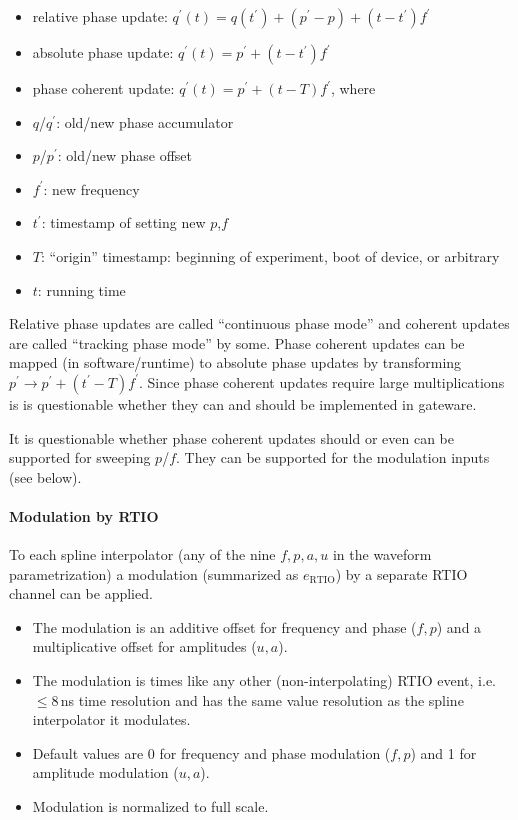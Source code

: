 \documentclass[11pt]{paper}
\begin{document}
\begin{itemize}
	\item relative phase update: $q^\prime(t) = q(t^\prime) + (p^\prime - p) + (t - t^\prime) f^\prime$
	\item absolute phase update: $q^\prime(t) = p^\prime + (t - t^\prime) f^\prime$
	\item phase coherent update: $q^\prime(t) = p^\prime + (t - T) f^\prime$, where
	\item $q$/$q^\prime$: old/new phase accumulator
	\item $p$/$p^\prime$: old/new phase offset
	\item $f^\prime$: new frequency
	\item $t^\prime$: timestamp of setting new $p$,$f$
	\item $T$: ``origin'' timestamp: beginning of experiment, boot of device, or arbitrary
	\item $t$: running time
\end{itemize}

Relative phase updates are called ``continuous phase mode'' and coherent updates are called ``tracking phase mode'' by some.
Phase coherent updates can be mapped (in software/runtime) to absolute phase updates by transforming $p^\prime \longrightarrow p^\prime + (t^\prime - T) f^\prime$.
Since phase coherent updates require large multiplications is is questionable whether they can and should be implemented in gateware.

It is questionable whether phase coherent updates should or even can be supported for sweeping $p$/$f$. They can be supported for the modulation inputs (see below).

\paragraph{Modulation by RTIO}

To each spline interpolator (any of the nine $f,p,a,u$ in the waveform
parametrization) a modulation (summarized as $e_\mathrm{RTIO}$) by a separate RTIO channel can be applied.


\begin{itemize}
	\item The modulation is an additive offset for frequency and phase ($f,p$) and a multiplicative offset for amplitudes ($u,a$).
	\item The modulation is times like any other (non-interpolating) RTIO event, i.e. $\leq 8$\,ns time resolution and has the same value resolution as the spline interpolator it modulates.
	\item Default values are 0 for frequency and phase modulation ($f,p$) and 1 for amplitude modulation ($u,a$).
	\item Modulation is normalized to full scale.
\end{itemize}
\end{document}
